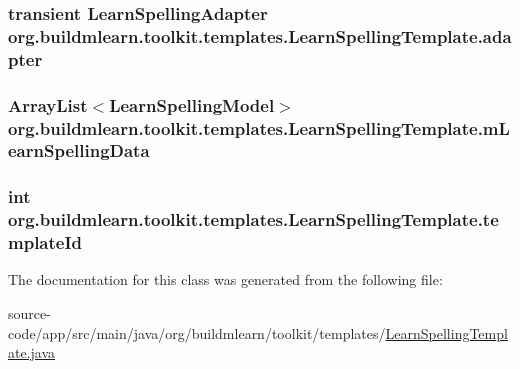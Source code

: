 \subsubsection[{\texorpdfstring{adapter}{adapter}}]{\setlength{\rightskip}{0pt plus 5cm}transient Learn\+Spelling\+Adapter org.\+buildmlearn.\+toolkit.\+templates.\+Learn\+Spelling\+Template.\+adapter\hspace{0.3cm}{\ttfamily [private]}}\hypertarget{classorg_1_1buildmlearn_1_1toolkit_1_1templates_1_1LearnSpellingTemplate_a6ebf13ae6c906777089b2b4686139a2a}{}\label{classorg_1_1buildmlearn_1_1toolkit_1_1templates_1_1LearnSpellingTemplate_a6ebf13ae6c906777089b2b4686139a2a}
\subsubsection[{\texorpdfstring{m\+Learn\+Spelling\+Data}{mLearnSpellingData}}]{\setlength{\rightskip}{0pt plus 5cm}Array\+List$<${\bf Learn\+Spelling\+Model}$>$ org.\+buildmlearn.\+toolkit.\+templates.\+Learn\+Spelling\+Template.\+m\+Learn\+Spelling\+Data\hspace{0.3cm}{\ttfamily [private]}}\hypertarget{classorg_1_1buildmlearn_1_1toolkit_1_1templates_1_1LearnSpellingTemplate_a81318e22742d557d80102eafc05a4548}{}\label{classorg_1_1buildmlearn_1_1toolkit_1_1templates_1_1LearnSpellingTemplate_a81318e22742d557d80102eafc05a4548}
\subsubsection[{\texorpdfstring{template\+Id}{templateId}}]{\setlength{\rightskip}{0pt plus 5cm}int org.\+buildmlearn.\+toolkit.\+templates.\+Learn\+Spelling\+Template.\+template\+Id\hspace{0.3cm}{\ttfamily [private]}}\hypertarget{classorg_1_1buildmlearn_1_1toolkit_1_1templates_1_1LearnSpellingTemplate_a9a0737d2b579527b9d375518b9097014}{}\label{classorg_1_1buildmlearn_1_1toolkit_1_1templates_1_1LearnSpellingTemplate_a9a0737d2b579527b9d375518b9097014}


The documentation for this class was generated from the following file\+:\begin{DoxyCompactItemize}
\item 
source-\/code/app/src/main/java/org/buildmlearn/toolkit/templates/\hyperlink{LearnSpellingTemplate_8java}{Learn\+Spelling\+Template.\+java}\end{DoxyCompactItemize}
